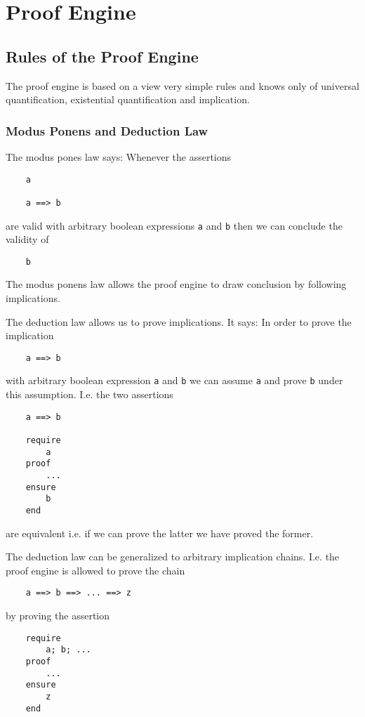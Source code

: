 \chapter{Proof Engine}


\section{Rules of the Proof Engine}


The proof engine is based on a view very simple rules and knows only of
universal quantification, existential quantification and implication.

\subsection{Modus Ponens and Deduction Law}

The modus pones law says: Whenever the assertions
\begin{lstlisting}
    a

    a ==> b
\end{lstlisting}
are valid with arbitrary boolean expressions \lstinline!a! and \lstinline!b!
then we can conclude the validity of
%
\begin{lstlisting}
    b
\end{lstlisting}

The modus ponens law allows the proof engine to draw conclusion by following
implications.

The deduction law allows us to prove implications. It says: In order to prove
the implication
\begin{lstlisting}
    a ==> b
\end{lstlisting}
with arbitrary boolean expression \lstinline!a! and \lstinline!b! we can
assume \lstinline!a! and prove \lstinline!b!  under this assumption. I.e. the
two assertions
\begin{lstlisting}
    a ==> b

    require
        a
    proof
        ...
    ensure
        b
    end
\end{lstlisting}
are equivalent i.e. if we can prove the latter we have proved the former.

The deduction law can be generalized to arbitrary implication chains. I.e. the
proof engine is allowed to prove the chain

\begin{lstlisting}
    a ==> b ==> ... ==> z
\end{lstlisting}
%
by proving the assertion
\begin{lstlisting}
    require
        a; b; ...
    proof
        ...
    ensure
        z
    end
\end{lstlisting}


